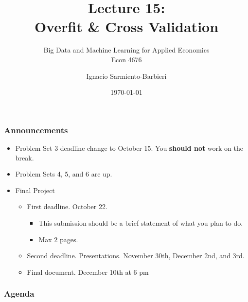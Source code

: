 \documentclass[
  shownotes,
  xcolor={svgnames},
  hyperref={colorlinks,citecolor=DarkBlue,linkcolor=DarkRed,urlcolor=DarkBlue}
  , aspectratio=169]{beamer}
\begin{document}
\title[Lecture 15]{Lecture 15: \\ Overfit \& Cross Validation}
\subtitle{Big Data and Machine Learning for Applied Economics \\ Econ 4676}
\date{\today}

\author[Sarmiento-Barbieri]{Ignacio Sarmiento-Barbieri}


\begin{frame}[noframenumbering]
\maketitle
\end{frame}


\begin{frame}
\frametitle{Announcements}

\begin{itemize}
  \item Problem Set 3 deadline change to October 15. You {\bf should not} work on the break.
  \item Problem Sets 4, 5, and 6 are up.
  \item Final Project
  \medskip
  \begin{itemize}
    \item First deadline. October 22. 
    \begin{itemize}
     \item This submission should be a brief statement of what you plan to do. 
     \item Max 2 pages.
     \end{itemize}
     \medskip
    \item  Second deadline. Presentations. November 30th, December 2nd, and 3rd.
      \medskip
    \item  Final document. December 10th at 6 pm
  \end{itemize}

\end{itemize}

\end{frame}


\begin{frame}
\frametitle{Agenda}

\tableofcontents

\end{frame}
\end{document}
